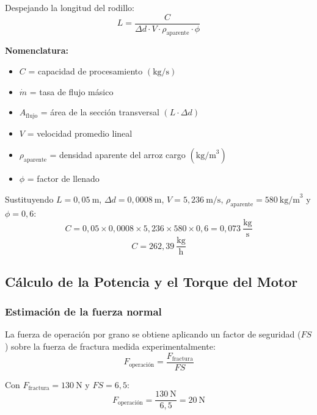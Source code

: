 Despejando la longitud del rodillo:
\begin{equation}
L = \frac{C}{\Delta d \cdot V \cdot \rho_{\text{aparente}} \cdot \phi}
\label{eq:Lrodillo}
\end{equation}

\noindent\textbf{Nomenclatura:}
\begin{itemize}[noitemsep]
\item $C$ = capacidad de procesamiento $(\text{kg/s})$
\item $\dot{m}$ = tasa de flujo másico
\item $A_{\text{flujo}}$ = área de la sección transversal $(L \cdot \Delta d)$
\item $V$ = velocidad promedio lineal
\item $\rho_{\text{aparente}}$ = densidad aparente del arroz cargo $(\text{kg/m}^{3})$
\item $\phi$ = factor de llenado
\end{itemize}

Sustituyendo $L = 0{,}05\ \text{m}$, $\Delta d = 0{,}0008\ \text{m}$, $V = 5{,}236\ \text{m/s}$, $\rho_{\text{aparente}} = 580\ \text{kg/m}^{3}$ y $\phi = 0{,}6$:
\begin{equation}
C = 0{,}05 \times 0{,}0008 \times 5{,}236 \times 580 \times 0{,}6 = 0{,}073\ \frac{\text{kg}}{\text{s}}
\end{equation}
\begin{equation}
C = 262{,}39\ \frac{\text{kg}}{\text{h}}
\end{equation}

\subsection{Cálculo de la Potencia y el Torque del Motor}

\subsubsection{Estimación de la fuerza normal}
La fuerza de operación por grano se obtiene aplicando un factor de seguridad ($FS$) sobre la fuerza de fractura medida experimentalmente:
\begin{equation}
F_{\text{operación}} = \frac{F_{\text{fractura}}}{FS}
\label{eq:Fop}
\end{equation}

Con $F_{\text{fractura}} = 130\ \text{N}$ y $FS = 6{,}5$:
\begin{equation}
F_{\text{operación}} = \frac{130\ \text{N}}{6{,}5} = 20\ \text{N}
\end{equation}

